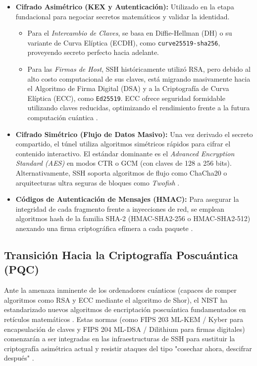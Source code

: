 \documentclass[a4paper,12pt]{article}
\begin{document}
\begin{itemize}
    \item \textbf{Cifrado Asimétrico (KEX y Autenticación):} Utilizado en la etapa fundacional para negociar secretos matemáticos y validar la identidad.
    \begin{itemize}
        \item Para el \textit{Intercambio de Claves}, se basa en Diffie-Hellman (DH) o su variante de Curva Elíptica (ECDH), como \texttt{curve25519-sha256}, proveyendo secreto perfecto hacia adelante.
        \item Para las \textit{Firmas de Host}, SSH históricamente utilizó RSA, pero debido al alto costo computacional de sus claves, está migrando masivamente hacia el Algoritmo de Firma Digital (DSA) y a la Criptografía de Curva Elíptica (ECC), como \texttt{Ed25519}. ECC ofrece seguridad formidable utilizando claves reducidas, optimizando el rendimiento frente a la futura computación cuántica \cite{redeszone_cripto}.
    \end{itemize}
    \item \textbf{Cifrado Simétrico (Flujo de Datos Masivo):} Una vez derivado el secreto compartido, el túnel utiliza algoritmos simétricos rápidos para cifrar el contenido interactivo. El estándar dominante es el \textit{Advanced Encryption Standard (AES)} en modos CTR o GCM (con claves de 128 a 256 bits). Alternativamente, SSH soporta algoritmos de flujo como ChaCha20 o arquitecturas ultra seguras de bloques como \textit{Twofish} \cite{redeszone_cripto}.
    \item \textbf{Códigos de Autenticación de Mensajes (HMAC):} Para asegurar la integridad de cada fragmento frente a inyecciones de red, se emplean algoritmos hash de la familia SHA-2 (HMAC-SHA2-256 o HMAC-SHA2-512) anexando una firma criptográfica efímera a cada paquete \cite{rfc4253_ietf}.
\end{itemize}

\subsection*{Transición Hacia la Criptografía Poscuántica (PQC)}
Ante la amenaza inminente de los ordenadores cuánticos (capaces de romper algoritmos como RSA y ECC mediante el algoritmo de Shor), el NIST ha estandarizado nuevos algoritmos de encriptación poscuántica fundamentados en retículos matemáticos \cite{nist_pqc_2024}. Estas normas (como FIPS 203 ML-KEM / Kyber para encapsulación de claves y FIPS 204 ML-DSA / Dilithium para firmas digitales) comenzarán a ser integradas en las infraestructuras de SSH para sustituir la criptografía asimétrica actual y resistir ataques del tipo "cosechar ahora, descifrar después" \cite{keyfactor_nist}.
\end{document}
